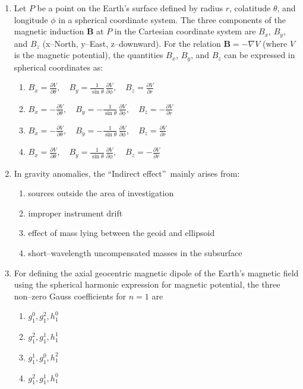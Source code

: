 \documentclass[journal,12pt,onecolumn]{IEEEtran}
\theoremstyle{remark}
\begin{document}
\begin{enumerate}
\item Let $P$ be a point on the Earth's surface defined by radius $r$, colatitude $\theta$, 
and longitude $\phi$ in a spherical coordinate system. The three components of the magnetic 
induction $\mathbf{B}$ at $P$ in the Cartesian coordinate system are $B_x$, $B_y$, and $B_z$ 
(x--North, y--East, z--downward). For the relation $\mathbf{B} = -\nabla V$ 
(where $V$ is the magnetic potential), the quantities $B_x$, $B_y$, and $B_z$ can be expressed 
in spherical coordinates as:
\vspace{0.5cm}


\begin{enumerate}
    \item $B_x = \frac{\partial V}{\partial \theta}, \quad 
          B_y = \frac{1}{\sin\theta}\,\frac{\partial V}{\partial \phi}, \quad
          B_z = \frac{\partial V}{\partial r}$
          
    \item $B_x = -\frac{\partial V}{\partial \theta}, \quad 
          B_y = -\frac{1}{\sin\theta}\,\frac{\partial V}{\partial \phi}, \quad
          B_z = -\frac{\partial V}{\partial r}$
          
    \item $B_x = -\frac{\partial V}{\partial \theta}, \quad 
          B_y = -\frac{1}{\sin\theta}\,\frac{\partial V}{\partial \phi}, \quad
          B_z = \frac{\partial V}{\partial r}$
          
    \item $B_x = \frac{\partial V}{\partial \theta}, \quad 
          B_y = \frac{1}{\sin\theta}\,\frac{\partial V}{\partial \phi}, \quad
          B_z = -\frac{\partial V}{\partial r}$
\end{enumerate}
\vspace{0.5cm}


\item In gravity anomalies, the \textquotedblleft Indirect effect\textquotedblright\ mainly arises from:
\begin{enumerate}
\item sources outside the area of investigation
\item improper instrument drift
\item effect of mass lying between the geoid and ellipsoid
\item short--wavelength uncompensated masses in the subsurface
\end{enumerate}

\item For defining the axial geocentric magnetic dipole of the Earth's magnetic field using the spherical harmonic expression for magnetic potential, the three non--zero Gauss coefficients for $n = 1$ are
\begin{multicols}{2}
\begin{enumerate}
\item $g_1^0, g_1^2, h_1^0$
\item $g_1^2, g_1^1, h_1^1$
\item $g_1^1, g_1^0, h_1^2$
\item $g_1^2, g_1^1, h_1^0$
\end{enumerate}
\end{multicols}


\end{enumerate}
\end{document}

